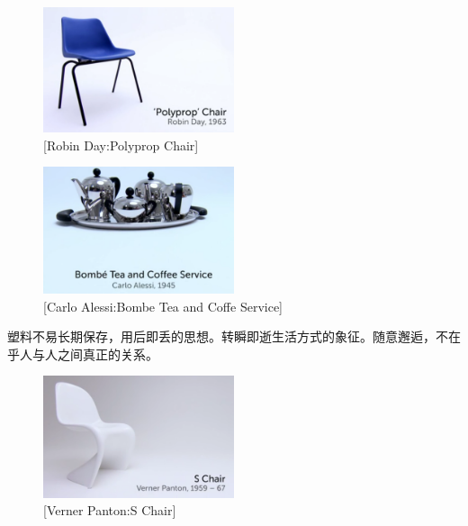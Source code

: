 \documentclass[UTF8]{../RepresentationUniverse}
\begin{document}
\begin{figure}[h]
    \centering
    \includegraphics[width=0.5\textwidth]{./src/figures/Polyprop Chair_2023-04-09_20-46-07.png}
    \caption{[Robin Day:Polyprop Chair]}
    \label{figure:Polyprop Chair}
\end{figure}



\begin{figure}[h]
    \centering
    \includegraphics[width=0.5\textwidth]{./src/figures/Bombe Tea and Coffe Service_2023-04-09_20-49-08.png}
    \caption{[Carlo Alessi:Bombe Tea and Coffe Service]}
    \label{figure:Bombe Tea and Coffe Service}
\end{figure}

塑料不易长期保存，用后即丢的思想。转瞬即逝生活方式的象征。随意邂逅，不在乎人与人之间真正的关系。



\begin{figure}[h]
    \centering
    \includegraphics[width=0.5\textwidth]{./src/figures/S Chair_2023-04-09_20-54-06.png}
    \caption{[Verner Panton:S Chair]}
    \label{figure:S Chair}
\end{figure}
\end{document}
